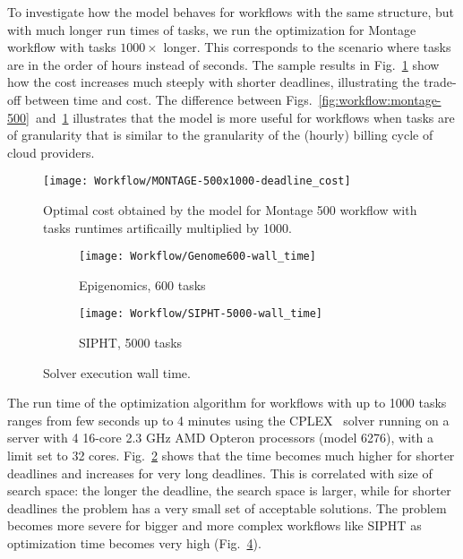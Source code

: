 {    To investigate how the model behaves for workflows with the same structure, but with much longer run times of tasks, we run the optimization for Montage workflow with tasks $1000 \times$ longer. This corresponds to the scenario where tasks are in the order of hours instead of seconds. The sample results in Fig.~\ref{fig:workflow:montage-500x1000} show how the cost increases much steeply with shorter deadlines, illustrating the trade-off between time and cost. The difference between Figs.~\ref{fig:workflow:montage-500}~and~\ref{fig:workflow:montage-500x1000} illustrates that the model is more useful for workflows when tasks are of granularity that is similar to the granularity of the (hourly) billing cycle of cloud providers.    

    \begin{figure}[tb]
       \centering \texttt{[image: Workflow/MONTAGE-500x1000-deadline\_cost]}
       \caption{Optimal cost obtained by the model for Montage 500 workflow with tasks runtimes artificailly 
       multiplied by 1000.
       \label{fig:workflow:montage-500x1000}}
    \end{figure}

    \begin{figure}[tb] 
       \centering
       
       \begin{subfigure}[b]{0.49\textwidth}  
         \texttt{[image: Workflow/Genome600-wall\_time]}
         \caption{Epigenomics, 600 tasks}
         \label{fig:workflow:genome-600-opttime}
       \end{subfigure}
       \begin{subfigure}[b]{0.49\textwidth}
         \texttt{[image: Workflow/SIPHT-5000-wall\_time]}
         \caption{SIPHT, 5000 tasks}
         \label{fig:workflow:sipht-5000-opttime}
       \end{subfigure}
       
       \caption{Solver execution wall time.}
    \end{figure}
  
    
    The run time of the optimization algorithm for workflows with up to 1000 tasks ranges from few seconds up to 4 minutes using the CPLEX~\cite{cplex} solver running on a server with 4 16-core 2.3 GHz AMD Opteron processors (model 6276), with a limit set to 32 cores. Fig.~\ref{fig:workflow:genome-600-opttime} shows that the time becomes much higher for shorter deadlines and increases for very long deadlines. This is correlated with size of search space: the longer the deadline, the search space is larger, while for shorter deadlines the problem has a very small set of acceptable solutions.  The problem becomes more severe for bigger and more complex workflows like SIPHT as optimization time becomes very high (Fig.~\ref{fig:workflow:sipht-5000-opttime}).
    
}
